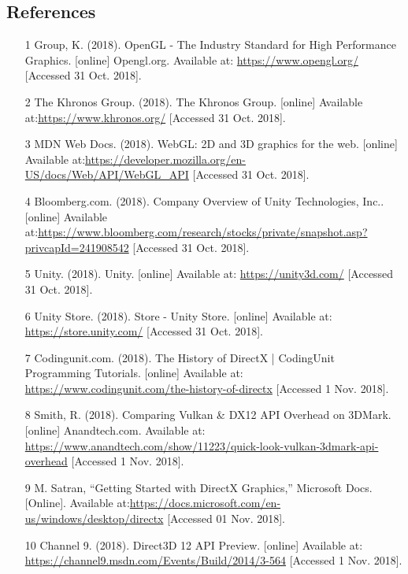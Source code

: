 \documentclass[onecolumn, draftclsnofoot,10pt, compsoc]{IEEEtran}
\begin{document}
\subsection{References}
\begin{enumerate}
\item [1] Group, K. (2018). OpenGL - The Industry Standard for High Performance Graphics. [online] Opengl.org. Available at: \url{https://www.opengl.org/} [Accessed 31 Oct. 2018].
\item [2] The Khronos Group. (2018). The Khronos Group. [online] Available at:\url{https://www.khronos.org/} [Accessed 31 Oct. 2018].
\item [3] MDN Web Docs. (2018). WebGL: 2D and 3D graphics for the web. [online] Available at:\url{https://developer.mozilla.org/en-US/docs/Web/API/WebGL_API} [Accessed 31 Oct. 2018].
\item [4] Bloomberg.com. (2018). Company Overview of Unity Technologies, Inc.. [online] Available at:\url{https://www.bloomberg.com/research/stocks/private/snapshot.asp?privcapId=241908542} [Accessed 31 Oct. 2018].
\item [5] Unity. (2018). Unity. [online] Available at: \url{https://unity3d.com/} [Accessed 31 Oct. 2018].
\item [6]Unity Store. (2018). Store - Unity Store. [online] Available at: \url{https://store.unity.com/} [Accessed 31 Oct. 2018].

\item [7]	Codingunit.com. (2018). The History of DirectX | CodingUnit Programming Tutorials. [online] Available at: \url{https://www.codingunit.com/the-history-of-directx} [Accessed 1 Nov. 2018].
\item [8]	Smith, R. (2018). Comparing Vulkan \& DX12 API Overhead on 3DMark. [online] Anandtech.com. Available at: \url{https://www.anandtech.com/show/11223/quick-look-vulkan-3dmark-api-overhead} [Accessed 1 Nov. 2018].
\item [9]	M. Satran, “Getting Started with DirectX Graphics,” Microsoft Docs. [Online]. Available at:\url{https://docs.microsoft.com/en-us/windows/desktop/directx} [Accessed 01 Nov. 2018].
\item [10]	Channel 9. (2018). Direct3D 12 API Preview. [online] Available at:
\url{https://channel9.msdn.com/Events/Build/2014/3-564} [Accessed 1 Nov. 2018].

\clearpage
\end{enumerate}

\end{document}
